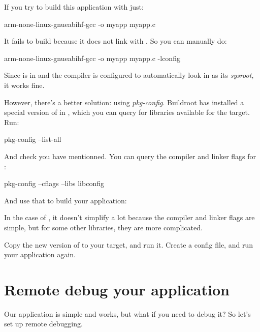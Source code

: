 If you try to build this application with just:

\begin{bashinput}
arm-none-linux-gnueabihf-gcc -o myapp myapp.c
\end{bashinput}

It fails to build because it does not link with . So
you can manually do:

\begin{bashinput}
arm-none-linux-gnueabihf-gcc -o myapp myapp.c -lconfig
\end{bashinput}

Since  is in  and the
compiler is configured to automatically look in 
as its {\em sysroot}, it works fine.

However, there's a better solution: using {\em pkg-config}. Buildroot
has installed a special version of  in
, which you can query for libraries
available for the target. Run:

\begin{bashinput}
pkg-config --list-all
\end{bashinput}

And check you have  mentionned. You can query the
compiler and linker flags for :

\begin{bashinput}
pkg-config --cflags --libs libconfig
\end{bashinput}

And use that to build your application:


In the case of , it doesn't simplify a lot because the
compiler and linker flags are simple, but for some other libraries,
they are more complicated.

Copy the new version of  to your target, and run
it. Create a  config file, and run your application
again.

\section{Remote debug your application}

Our application is simple and works, but what if you need to debug it?
So let's set up remote debugging.

